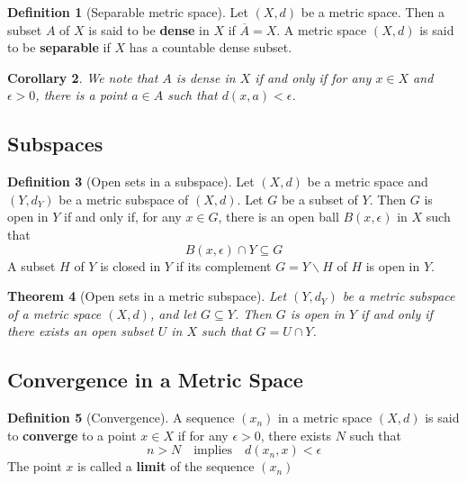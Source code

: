 \documentclass[10pt, oneside, reqno]{amsart}
\theoremstyle{plain}%
\newtheorem{thm}{Theorem}[section]
\newtheorem{cor}[thm]{Corollary}
\theoremstyle{definition}
\newtheorem{defn}[thm]{Definition}
\theoremstyle{remark}
\newcommand{\met}{(X,d)}
\newcommand{\ol}[1]{\overline{#1}}
\begin{document}
\begin{defn}[Separable metric space]
	Let $\met$ be a metric space.  Then a subset $A$ of $X$ is said to be \textbf{dense} in $X$ if $\ol A = X$.  A metric space $\met$ is said to be \textbf{separable} if $X$ has a countable dense subset.
\end{defn}

\begin{cor}
	We note that $A$ is dense in $X$ if and only if for any $x \in X$ and $\epsilon > 0$, there is a point $a \in A$ such that $d(x,a) < \epsilon$.
\end{cor}


\subsection{Subspaces} %
\label{sec:subspaces}

\begin{defn}[Open sets in a subspace]
	Let $\met$ be a metric space and $(Y, d_Y)$ be a metric subspace of $\met$.  Let $G$ be a subset of $Y$.  Then $G$ is open in $Y$ if and only if, for any $x \in G$, there is an open ball $B(x, \epsilon)$ in $X$ such that \[
		B(x, \epsilon) \cap Y \subseteq G
	\]
	A subset $H$ of $Y$ is closed in $Y$ if its complement $G = Y \backslash H$ of $H$ is open in $Y$.

\end{defn}
\begin{thm}[Open sets in a metric subspace]
	Let $(Y, d_Y)$ be a metric subspace of a metric space $\met$, and let $G \subseteq Y$.  Then $G$ is open in $Y$ if and only if there exists an open subset $U$ in $X$ such that $G = U \cap Y$.
\end{thm}




\subsection{Convergence in a Metric Space} %
\label{sub:convergence_in_a_metric_space}

\begin{defn}[Convergence]
	A sequence $(x_n)$ in a metric space $\met$ is said to \textbf{converge} to a point $x \in X$ if for any $\epsilon > 0$, there exists $N$ such that \[
		n > N \quad \text{implies} \quad d(x_n, x) < \epsilon
	\]
	The point $x$ is called a \textbf{limit} of the sequence $(x_n)$
\end{defn}
\end{document}

